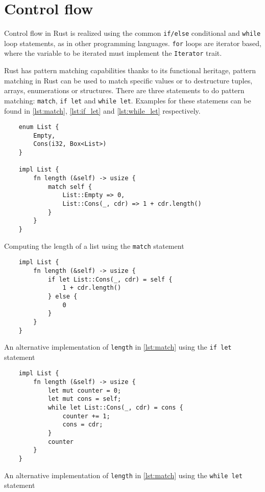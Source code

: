 \section{Control flow}

Control flow in Rust is realized using the common \texttt{if/else} conditional
and \texttt{while} loop statements, as in other programming languages.
\texttt{for} loops are iterator based, where the variable to be iterated must
implement the \texttt{Iterator} trait.

Rust has pattern matching capabilities thanks to its functional heritage,
pattern matching in Rust can be used to match specific values or to destructure
tuples, arrays, enumerations or structures. There are three statements to do
pattern matching: \texttt{match}, \texttt{if let} and \texttt{while let}.
Examples for these statemens can be found in \ref{lst:match}, \ref{lst:if_let}
and \ref{lst:while_let} respectively.

\begin{listing}[ht]
	\begin{verbatim}
    enum List {
        Empty,
        Cons(i32, Box<List>)
    }

    impl List {
        fn length (&self) -> usize {
            match self {
                List::Empty => 0,
                List::Cons(_, cdr) => 1 + cdr.length()
            }
        } 
    }
    \end{verbatim}
    \caption{Computing the length of a list using the \texttt{match} statement}
  \label{lst:match}
\end{listing}

\begin{listing}[ht]
	\begin{verbatim}
    impl List {
        fn length (&self) -> usize {
            if let List::Cons(_, cdr) = self {
                1 + cdr.length()
            } else {
                0
            }
        } 
    }
    \end{verbatim}
    \caption{An alternative implementation of \texttt{length} in \ref{lst:match} using the \texttt{if let} statement}
  \label{lst:if_let}
\end{listing}

\begin{listing}[ht]
	\begin{verbatim}
    impl List {
        fn length (&self) -> usize {
            let mut counter = 0;
            let mut cons = self;
            while let List::Cons(_, cdr) = cons {
                counter += 1;
                cons = cdr;
            }
            counter
        } 
    }
    \end{verbatim}
    \caption{An alternative implementation of \texttt{length} in \ref{lst:match}
    using the \texttt{while let} statement}
  \label{lst:while_let}
\end{listing}

